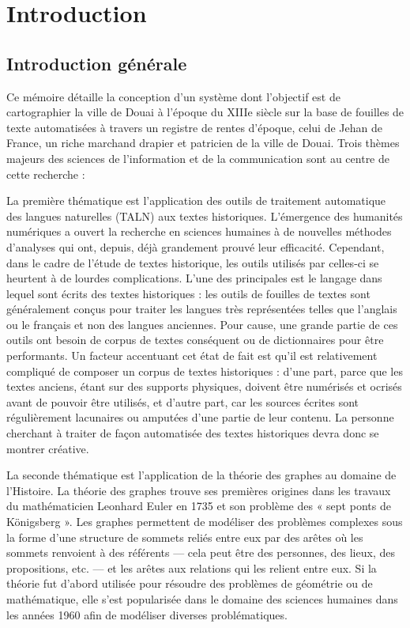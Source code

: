 \chapter{Introduction}
\section{Introduction générale}
 Ce mémoire détaille la conception d’un système dont l’objectif est de cartographier la ville de Douai à l’époque du XIIIe siècle sur la base de fouilles de texte automatisées à travers un registre de rentes d'époque, celui de Jehan de France, un riche marchand drapier et patricien de la ville de Douai. Trois thèmes majeurs des sciences de l'information et de la communication sont au centre de cette recherche :
 
 La première thématique est l’application des outils de traitement automatique des langues naturelles (TALN) aux textes historiques. L’émergence des humanités numériques a ouvert la recherche en sciences humaines à de nouvelles méthodes d’analyses qui ont, depuis, déjà grandement prouvé leur efficacité. Cependant, dans le cadre de l’étude de textes historique, les outils utilisés par celles-ci se heurtent à de lourdes complications. L’une des principales est le langage dans lequel sont écrits des textes historiques : les outils de fouilles de textes sont généralement conçus pour traiter les langues très représentées telles que l’anglais ou le français et non des langues anciennes. Pour cause, une grande partie de ces outils ont besoin de corpus de textes conséquent ou de dictionnaires pour être performants. Un facteur accentuant cet état de fait est qu’il est relativement compliqué de composer un corpus de textes historiques : d’une part, parce que les textes anciens, étant sur des supports physiques, doivent être numérisés et ocrisés avant de pouvoir être utilisés, et d’autre part, car les sources écrites sont régulièrement lacunaires ou amputées d’une partie de leur contenu. La personne cherchant à traiter de façon automatisée des textes historiques devra donc se montrer créative.
 
La seconde thématique est l’application de la théorie des graphes au domaine de l’Histoire. La théorie des graphes trouve ses premières origines dans les travaux du mathématicien Leonhard Euler en 1735 et son problème des « sept ponts de Königsberg ». Les graphes permettent de modéliser des problèmes complexes sous la forme d’une structure de sommets reliés entre eux par des arêtes où les sommets renvoient à des référents — cela peut être des personnes, des lieux, des propositions, etc. — et les arêtes aux relations qui les relient entre eux. Si la théorie fut d’abord utilisée pour résoudre des problèmes de géométrie ou de mathématique, elle s’est popularisée dans le domaine des sciences humaines dans les années 1960 afin de modéliser diverses problématiques.

